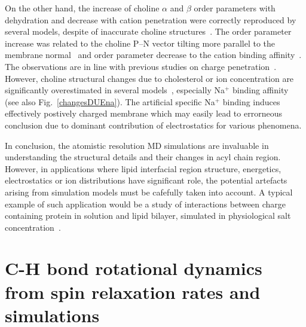\documentclass[aps,prl,superscriptaddress,twocolumn]{revtex4}
\begin{document}
On the other hand, the increase of choline $\alpha$ and $\beta$ order parameters with dehydration 
and decrease with cation penetration were correctly reproduced by several models, 
despite of inaccurate choline structures~\cite{botan15,ionpaper}. The order parameter increase
was related to the choline P--N vector tilting more parallel to the membrane normal~\cite{botan15}
and order parameter decrease to the cation binding affinity~\cite{ionpaper}. 
The observations are in line with previous studies on charge penetration~\cite{akutsu81,altenbach84,seelig87,scherer89}.
However, choline structural changes due to cholesterol or ion concentration are significantly overestimated
in several models~\cite{ferreira13,botan15,ionpaper,madej15}, especially Na$^{+}$ binding affinity~\cite{ionpaper} (see also Fig.~\ref{changesDUEna}). 
The artificial specific Na$^{+}$  binding induces effectively postively charged membrane which may easily
lead to errorneous conclusion due to dominant contribution of electrostatics for various phenomena.

In conclusion, the atomistic resolution MD simulations are invaluable in understanding the 
structural details and their changes in acyl chain region. However, in applications where 
lipid interfacial region structure, energetics, electrostatics or ion distributions have significant role,
the potential artefacts arising from simulation models must be cafefully taken into account.
A typical example of such application would be a study of interactions between charge containing protein in solution
and lipid bilayer, simulated in physiological salt concentration~\cite{arkhipov13,kaszuba15}.


\section{C-H bond rotational dynamics from spin relaxation rates and simulations}\label{dynamicsSECTION}


\end{document}

